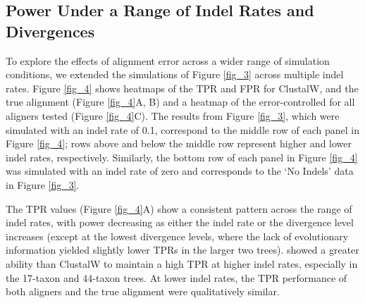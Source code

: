 \documentclass{article}
\begin{document}
\subsection*{\Sw Power Under a Range of Indel Rates and Divergences}

To explore the effects of alignment error across a wider range of
simulation conditions, we extended the simulations of Figure
\ref{fig_3} across multiple indel rates. Figure \ref{fig_4} shows
heatmaps of the TPR and FPR for ClustalW, \prankc and the true
alignment (Figure \ref{fig_4}A, B) and a heatmap of the
error-controlled \tpr for all aligners tested (Figure \ref{fig_4}C).
  The results from
Figure \ref{fig_3}, which were simulated with an indel rate of 0.1,
correspond to the middle row of each panel in Figure \ref{fig_4}; rows
above and below the middle row represent higher and lower indel rates,
respectively. Similarly, the bottom row of each panel in Figure
\ref{fig_4} was simulated with an indel rate of zero and corresponds
to the `No Indels' data in Figure \ref{fig_3}.

The TPR values (Figure \ref{fig_4}A) show a consistent pattern
across the range of indel rates, with power decreasing as either the
indel rate or the divergence level increases (except at the lowest
divergence levels, where the lack of evolutionary information yielded
slightly lower TPRs in the larger two trees). \prankc{} showed a
greater ability than ClustalW to maintain a high TPR at higher indel
rates, especially in the 17-taxon and 44-taxon trees. At lower indel
rates, the TPR performance of both aligners and the true alignment
were qualitatively similar.
\end{document}
